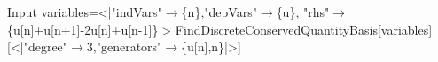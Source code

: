 \begin{mmaCell}[moredefined={variables, FindDiscreteConservedQuantityBasis}]{Input}
  variables=<|"indVars"\(\pmb{\to}\)\{n\},"depVars"\(\pmb{\to}\)\{u\},
  "rhs"\(\pmb{\to}\)\{u[n]+u[n+1]-2u[n]+u[n-1]\}|>
  FindDiscreteConservedQuantityBasis[variables]
  [<|"degree"\(\pmb{\to}\)3,"generators"\(\pmb{\to}\)\{u[n],n\}|>]
  
\end{mmaCell}